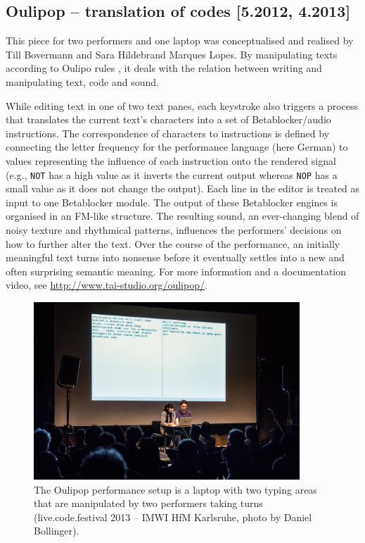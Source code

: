 \documentclass[letterpaper, 12pt]{article}
\begin{document}
\subsection{Oulipop -- translation of codes [5.2012, 4.2013]}
\label{sub:oulipop}

This piece for two performers and one laptop was conceptualised and realised by Till Bovermann and Sara Hildebrand Marques Lopes.
By manipulating texts according to Oulipo rules \citep*{mathews2005-oul}, it deals with the relation between writing and manipulating text, code and sound.

While editing text in one of two text panes, each keystroke also triggers a process that translates the current text's characters into a set of Betablocker/audio instructions.
The correspondence of characters to instructions is defined by connecting the letter frequency for the performance language (here German) to values representing the influence of each instruction onto the rendered signal (e.g., \texttt{NOT} has a high value as it inverts the current output whereas \texttt{NOP} has a small value as it does not change the output).
Each line in the editor is treated as input to one Betablocker module.
The output of these Betablocker engines is organised in an FM-like structure.
The resulting sound, an ever-changing blend of noisy texture and rhythmical patterns, influences the performers' decisions on how to further alter the text.
Over the course of the performance, an initially meaningful text turns into nonsense before it eventually settles into a new and often surprising semantic meaning.
For more information and a documentation video, see \url{http://www.tai-studio.org/oulipop/}.
\begin{figure}
	\centering
		\includegraphics[width=10cm]{20130420-live-code-fest-20}
	\caption{The Oulipop performance setup is a laptop with two typing areas that are manipulated by two performers taking turns (live.code.festival 2013 -- IMWI HfM Karlsruhe, photo by Daniel Bollinger).}
	\label{fig:fig_20120509-IMG_3278}
\end{figure}
\parskip 18pt
\end{document}
